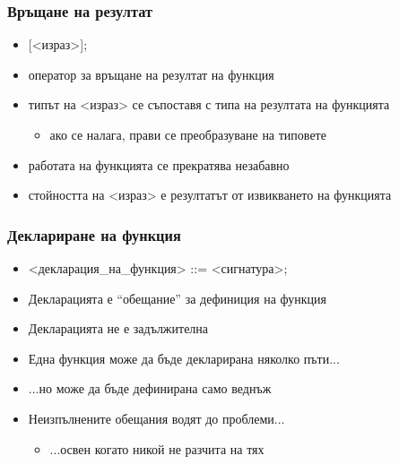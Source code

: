 \documentclass{beamer}
\begin{document}
\begin{frame}
  \frametitle{Връщане на резултат}

  \begin{itemize}[<+->]
  \item {} [<израз>]\tta;
  \item оператор за връщане на резултат на функция
  \item типът на <израз> се съпоставя с типа на резултата на функцията
    \begin{itemize}
    \item ако се налага, прави се преобразуване на типовете
    \end{itemize}
  \item работата на функцията се прекратява незабавно
  \item стойността на <израз> е резултатът от извикването на функцията
  \end{itemize}
\end{frame}

\begin{frame}
  \frametitle{Деклариране на функция}

  \begin{itemize}[<+->]
  \item{} <декларация\_на\_функция> ::= <сигнатура>\tta;
  \item Декларацията е ``обещание'' за дефиниция на функция
  \item Декларацията не е задължителна
  \item Една функция може да бъде декларирана няколко пъти...
  \item ...но може да бъде дефинирана \alert{само веднъж}
  \item Неизпълнените обещания водят до проблеми...
    \begin{itemize}
    \item ...освен когато никой не разчита на тях
    \end{itemize}
  \end{itemize}
\end{frame}
\end{document}
